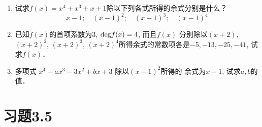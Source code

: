 \begin{ex}
\begin{enumerate}
    \item 试求$f(x)=x^4+x^3+x+1$除以下列各式所得的余式分别是什么？
\[x-1;\quad  (x-1)^2;\quad (x-1)^3;\quad (x-1)^4\]
\item 已知$f(x)$的首项系数为3, ${\rm deg}f(x)=4$, 而且$f(x)$
分别除以$(x+2)$, $(x+2)^2$, $(x+2)^3$, $(x+2)^4$所得余式的常数项各是$-5,-13,-25,-41$, 试求$f(x)$．
\item 多项式 $x^4+ax^3-3x^2+bx+3$ 除以$(x-1)^2$所得的
余式为$x+1$, 试求$a,b$的值．
\end{enumerate}
\end{ex}


\section*{习题3.5}
